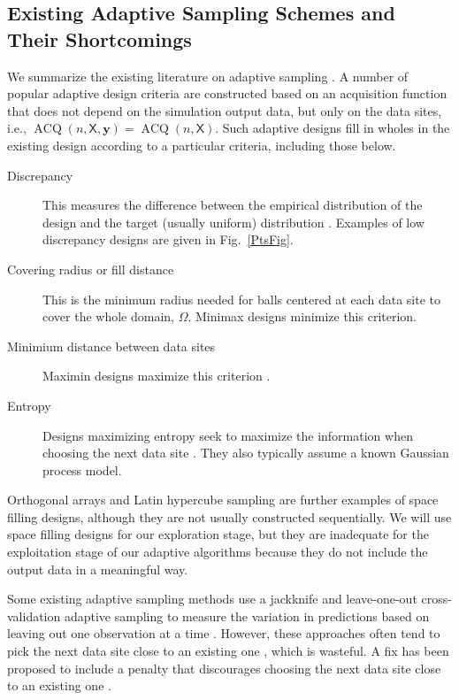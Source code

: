 \documentclass[11pt]{NSFamsart}
\DeclareMathOperator{\VAL}{ACQ}
\newcommand{\mX}{\mathsf{X}}
\newcommand{\by}{{\boldsymbol{y}}}
\begin{document}
\subsection{Existing Adaptive Sampling Schemes and Their Shortcomings} \label{sec:shortExist}

We summarize the existing literature on adaptive sampling \cite{aute2013cross,burnaev2015adaptive,fu2017adaptive,gramacy2008adaptive,jin2002sequential,kleijnen2004application}. A number of popular adaptive design criteria are constructed based on an acquisition function that does not depend on the simulation output data, but only on the data sites, i.e., $\VAL(n,\mX,\by) = \VAL(n,\mX)$.  Such adaptive designs fill in wholes in the existing design according to a particular criteria, including those below. 
\begin{description}
    \item[Discrepancy] This measures the difference between the empirical distribution of the design and the target (usually uniform) distribution \cite{FangEtal19a}.  Examples of low discrepancy designs are given in Fig.\ \ref{PtsFig}.  
    \item[Covering radius or fill distance] This is the minimum radius needed for balls centered at each data site to cover the whole domain, $\Omega$.  Minimax designs minimize this criterion.
    \item[Minimium distance between data sites]  Maximin designs maximize this criterion \cite{jin2002sequential}.
    \item[Entropy] Designs maximizing entropy seek to maximize the information when choosing the next data site \cite{jin2002sequential}.  They also typically assume a known Gaussian process model.
\end{description}
Orthogonal arrays and Latin hypercube sampling are further examples of space filling designs, although they are not usually constructed sequentially.  We will use space filling designs for our exploration stage, but they are inadequate for the exploitation stage of our adaptive algorithms because they do not include the output data in a meaningful way.  

Some existing adaptive sampling methods use a jackknife and leave-one-out cross-validation adaptive sampling to measure the variation in predictions based on leaving out one observation at a time \cite{aute2013cross,jin2002sequential, kleijnen2004application}.  However, these approaches often tend to pick the next data site close to an existing one \cite{jin2002sequential}, which is wasteful.  A fix has been proposed to include a penalty that discourages choosing the next data site close to an existing one \cite{aute2013cross,jin2002sequential}.
\end{document}
